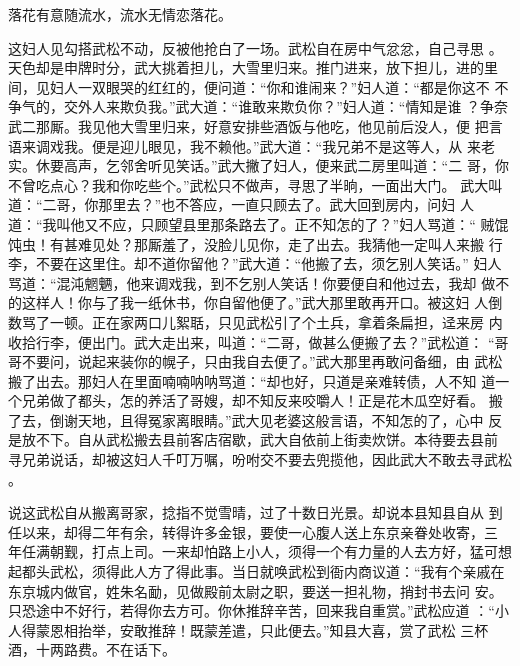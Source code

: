 落花有意随流水，流水无情恋落花。

这妇人见勾搭武松不动，反被他抢白了一场。武松自在房中气忿忿，自己寻思
。天色却是申牌时分，武大挑着担儿，大雪里归来。推门进来，放下担儿，进的里
间，见妇人一双眼哭的红红的，便问道：“你和谁闹来？”妇人道：“都是你这不
不争气的，交外人来欺负我。”武大道：“谁敢来欺负你？”妇人道：“情知是谁
？争奈武二那厮。我见他大雪里归来，好意安排些酒饭与他吃，他见前后没人，便
把言语来调戏我。便是迎儿眼见，我不赖他。”武大道：“我兄弟不是这等人，从
来老实。休要高声，乞邻舍听见笑话。”武大撇了妇人，便来武二房里叫道：“二
哥，你不曾吃点心？我和你吃些个。”武松只不做声，寻思了半晌，一面出大门。
武大叫道：“二哥，你那里去？”也不答应，一直只顾去了。武大回到房内，问妇
人道：“我叫他又不应，只顾望县里那条路去了。正不知怎的了？”妇人骂道：“
贼馄饨虫！有甚难见处？那厮羞了，没脸儿见你，走了出去。我猜他一定叫人来搬
行李，不要在这里住。却不道你留他？”武大道：“他搬了去，须乞别人笑话。”
妇人骂道：“混沌魍魉，他来调戏我，到不乞别人笑话！你要便自和他过去，我却
做不的这样人！你与了我一纸休书，你自留他便了。”武大那里敢再开口。被这妇
人倒数骂了一顿。正在家两口儿絮聒，只见武松引了个土兵，拿着条扁担，迳来房
内收拾行李，便出门。武大走出来，叫道：“二哥，做甚么便搬了去？”武松道：
“哥哥不要问，说起来装你的幌子，只由我自去便了。”武大那里再敢问备细，由
武松搬了出去。那妇人在里面喃喃呐呐骂道：“却也好，只道是亲难转债，人不知
道一个兄弟做了都头，怎的养活了哥嫂，却不知反来咬嚼人！正是花木瓜空好看。
搬了去，倒谢天地，且得冤家离眼睛。”武大见老婆这般言语，不知怎的了，心中
反是放不下。自从武松搬去县前客店宿歇，武大自依前上街卖炊饼。本待要去县前
寻兄弟说话，却被这妇人千叮万嘱，吩咐交不要去兜揽他，因此武大不敢去寻武松
。

说这武松自从搬离哥家，捻指不觉雪晴，过了十数日光景。却说本县知县自从
到任以来，却得二年有余，转得许多金银，要使一心腹人送上东京亲眷处收寄，三
年任满朝觐，打点上司。一来却怕路上小人，须得一个有力量的人去方好，猛可想
起都头武松，须得此人方了得此事。当日就唤武松到衙内商议道：“我有个亲戚在
东京城内做官，姓朱名勔，见做殿前太尉之职，要送一担礼物，捎封书去问
安。只恐途中不好行，若得你去方可。你休推辞辛苦，回来我自重赏。”武松应道
：“小人得蒙恩相抬举，安敢推辞！既蒙差遣，只此便去。”知县大喜，赏了武松
三杯酒，十两路费。不在话下。

